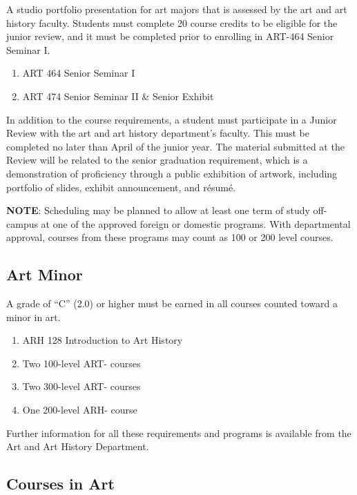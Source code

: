 \documentclass[
  letterpaper,
]{scrbook}
\providecommand{\tightlist}{%
  \setlength{\itemsep}{0pt}\setlength{\parskip}{0pt}}
\begin{document}
A studio portfolio presentation for art majors that is assessed by the
art and art history faculty. Students must complete 20 course credits to
be eligible for the junior review, and it must be completed prior to
enrolling in ART-464 Senior Seminar I.

\begin{enumerate}
\def\labelenumi{\arabic{enumi}.}
\setcounter{enumi}{7}
\tightlist
\item
  ART 464 Senior Seminar I
\item
  ART 474 Senior Seminar II \& Senior Exhibit
\end{enumerate}

In addition to the course requirements, a student must participate in a
Junior Review with the art and art history department's faculty. This
must be completed no later than April of the junior year. The material
submitted at the Review will be related to the senior graduation
requirement, which is a demonstration of proficiency through a public
exhibition of artwork, including portfolio of slides, exhibit
announcement, and résumé.

\textbf{NOTE}: Scheduling may be planned to allow at least one term of
study off-campus at one of the approved foreign or domestic programs.
With departmental approval, courses from these programs may count as 100
or 200 level courses.

\subsection{Art Minor}\label{art-minor}

A grade of ``C'' (2.0) or higher must be earned in all courses counted
toward a minor in art.

\begin{enumerate}
\def\labelenumi{\arabic{enumi}.}
\tightlist
\item
  ARH 128 Introduction to Art History
\item
  Two 100-level ART- courses
\item
  Two 300-level ART- courses
\item
  One 200-level ARH- course
\end{enumerate}

Further information for all these requirements and programs is available
from the Art and Art History Department.

\subsection{Courses in Art}\label{courses-in-art}
\end{document}
